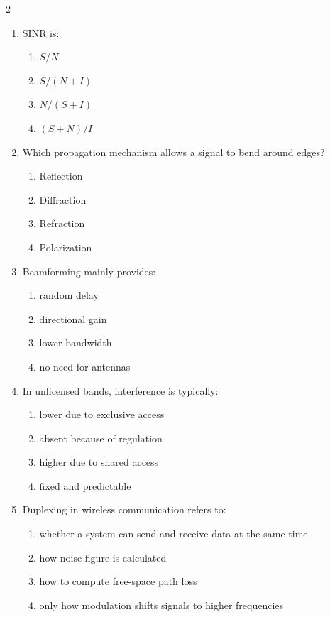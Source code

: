 \begin{multicols}{2}
\begin{enumerate}[leftmargin=*, itemsep=0.4em]
\item SINR is:
\begin{enumerate}[label=\alph*)]
\item $S/N$
\item $S/(N+I)$
\item $N/(S+I)$
\item $(S+N)/I$
\end{enumerate}

\item Which propagation mechanism allows a signal to bend around edges?
\begin{enumerate}[label=\alph*)]
\item Reflection
\item Diffraction
\item Refraction
\item Polarization
\end{enumerate}

\item Beamforming mainly provides:
\begin{enumerate}[label=\alph*)]
\item random delay
\item directional gain
\item lower bandwidth
\item no need for antennas
\end{enumerate}

\item In unlicensed bands, interference is typically:
\begin{enumerate}[label=\alph*)]
\item lower due to exclusive access
\item absent because of regulation
\item higher due to shared access
\item fixed and predictable
\end{enumerate}

\item Duplexing in wireless communication refers to:
\begin{enumerate}[label=\alph*)]
\item whether a system can send and receive data at the same time
\item how noise figure is calculated
\item how to compute free-space path loss
\item only how modulation shifts signals to higher frequencies
\end{enumerate}


\end{enumerate}
\end{multicols}
